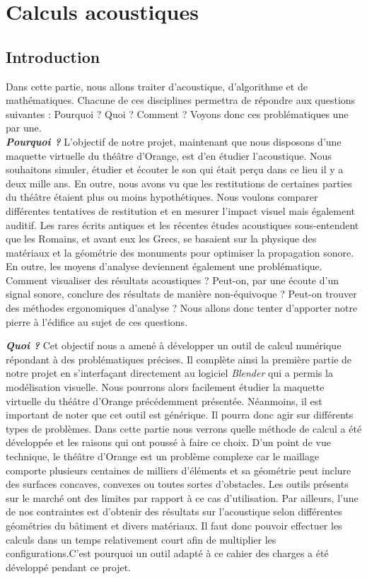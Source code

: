 \part{Calculs acoustiques}
	\chapter*{Introduction}
Dans cette partie, nous allons traiter d'acoustique, d'algorithme et de mathématiques. Chacune de ces disciplines permettra de répondre aux questions suivantes : Pourquoi ? Quoi ? Comment ? Voyons donc ces problématiques une par une.\\

\textit{\textbf{Pourquoi ?}} L'objectif de notre projet, maintenant que nous disposons d'une maquette virtuelle du théâtre d'Orange, est d'en étudier l'acoustique. Nous souhaitons simuler, étudier et écouter le son qui était perçu dans ce lieu il y a deux mille ans. En outre, nous avons vu que les restitutions de certaines parties du théâtre étaient plus ou moins hypothétiques. Nous voulons comparer différentes tentatives de restitution et en mesurer l'impact visuel mais également auditif. Les rares écrits antiques et les récentes études acoustiques sous-entendent que les Romains, et avant eux les Grecs, se basaient sur la physique des matériaux et la géométrie des monuments pour optimiser la propagation sonore. En outre, les moyens d'analyse  deviennent également une problématique. Comment visualiser des résultats acoustiques ? Peut-on, par une écoute d'un signal sonore, conclure des résultats de manière non-équivoque ? Peut-on trouver des méthodes ergonomiques d'analyse ? Nous allons donc tenter d'apporter notre pierre à l'édifice au sujet de ces questions. 

\textit{\textbf{Quoi ?}} Cet objectif nous a amené à développer un outil de calcul numérique répondant à des problématiques précises. Il complète ainsi la première partie de notre projet en s'interfaçant directement au logiciel \textit{Blender} qui a permis la modélisation visuelle. Nous pourrons alors facilement étudier la maquette virtuelle du théâtre d'Orange précédemment présentée. Néanmoins, il est important de noter que cet outil est générique. Il pourra donc agir sur différents types de problèmes. Dans cette partie nous verrons quelle méthode de calcul a été développée et les raisons qui ont poussé à faire ce choix. D'un point de vue technique, le théâtre d'Orange est un problème complexe car le maillage comporte plusieurs centaines de milliers d'éléments et sa géométrie peut inclure des surfaces concaves, convexes ou toutes sortes d'obstacles. Les outils présents sur le marché ont des limites par rapport à ce cas d'utilisation. Par ailleurs, l'une de nos contraintes est d'obtenir des résultats sur l'acoustique selon différentes géométries du bâtiment et divers matériaux. Il faut donc pouvoir effectuer les calculs dans un temps relativement court afin de multiplier les configurations.C'est pourquoi un outil adapté à ce cahier des charges a été développé pendant ce projet.



